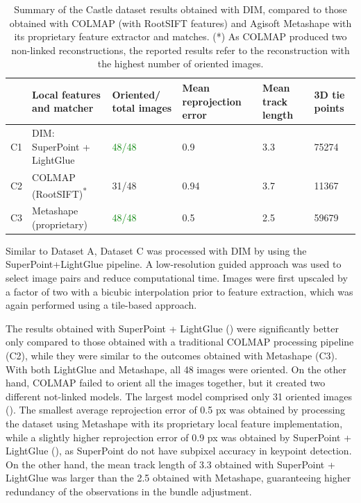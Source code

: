 \begin{table}
    \centering
    \caption{Summary of the Castle dataset results obtained with DIM, compared to those obtained with COLMAP (with RootSIFT features) and Agisoft Metashape with its proprietary feature extractor and matches. (*) As COLMAP produced two non-linked reconstructions, the reported results refer to the reconstruction with the highest number of oriented images.} 
    \label{tab:5:castle_statistics}
    
    \begin{tabular}{l p{3.5cm} p{2.2cm} p{2.2cm} p{2.2cm} p{2.2cm}}
    \toprule
    & Local features \newline and matcher & Oriented/ \newline total images & Mean reprojection error \newline [px] & Mean track \newline length &  3D tie points\\
    \midrule
    C1 &DIM: SuperPoint \newline + LightGlue           & \textcolor{green}{48/48}     & 0.9   & 3.3   & 75274 \\
    C2 &COLMAP \newline (RootSIFT)\textsuperscript{*} & 31/48     & 0.94  & 3.7   & 11367 \\
    C3 &Metashape \newline (proprietary)               & \textcolor{green}{48/48}     & 0.5   & 2.5   & 59679 \\ 
    \bottomrule
    \end{tabular}
\end{table}

Similar to Dataset A, Dataset C was processed with DIM by using the SuperPoint+LightGlue pipeline. 
A low-resolution guided approach was used to select image pairs and reduce computational time. 
Images were first upscaled by a factor of two with a bicubic interpolation prior to feature extraction, which was again performed using a tile-based approach.

The results obtained with SuperPoint + LightGlue () were significantly better only compared to those obtained with a traditional COLMAP processing pipeline (C2), while they were similar to the outcomes obtained with Metashape (C3). 
With both LightGlue and Metashape, all 48 images were oriented.
On the other hand, COLMAP failed to orient all the images together, but it created two different not-linked models.
The largest model comprised only 31 oriented images (). 
The smallest average reprojection error of 0.5 px was obtained by processing the dataset using Metashape with its proprietary local feature implementation, while a slightly higher reprojection error of 0.9 px was obtained by SuperPoint + LightGlue (), as SuperPoint do not have subpixel accuracy in keypoint detection. 
On the other hand, the mean track length of 3.3 obtained with SuperPoint + LightGlue was larger than the 2.5 obtained with Metashape, guaranteeing higher redundancy of the observations in the bundle adjustment. 


